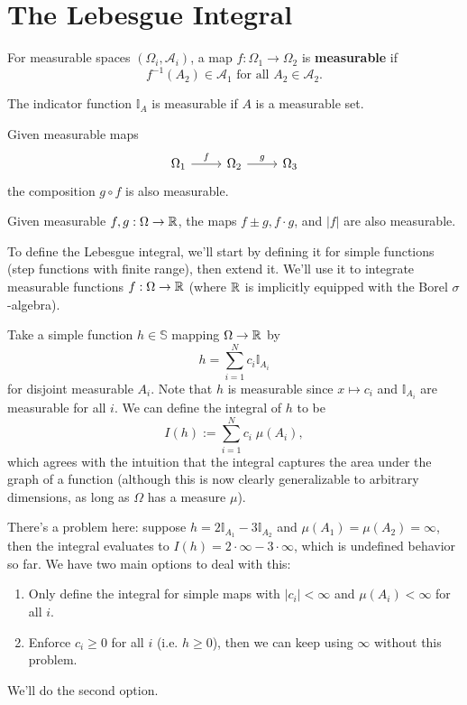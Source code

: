 \documentclass[twoside,10pt]{article}
\begin{document}
\section{The Lebesgue Integral}

\begin{defn}[]
For measurable spaces $(\Omega_i,\mathcal{A}_{i})$, a map $f:\Omega_1\to \Omega_2$ is \textbf{measurable} if
\[
f^{-1}(A_2) \in \mathcal{A}_{1} \text{ for all } A_2 \in \mathcal{A}_{2}.
\]
\end{defn}

\begin{ex}[]
The indicator function $\mathbb{I}_{A}$ is measurable if $A$ is a measurable set.
\end{ex}

\begin{prop}
Given measurable maps
\[\begin{tikzcd}
	{\Omega_1} & {\Omega_2} & {\Omega_3}
	\arrow["f", from=1-1, to=1-2]
	\arrow["g", from=1-2, to=1-3]
\end{tikzcd}\]
the composition $g \circ f$ is also measurable.
\end{prop}

\begin{ex}[]
Given measurable $f,g: \Omega \to \mathbb{R}$, the maps $f \pm g, f\cdot g$, and $|f|$ are also measurable.
\end{ex}

To define the Lebesgue integral, we'll start by defining it for simple functions (step functions with finite range), then extend it. We'll use it to integrate measurable functions $f:\Omega \to \mathbb{R}$ (where $\mathbb{R}$ is implicitly equipped with the Borel $\sigma$-algebra).

Take a simple function $h \in \mathbb{S}$ mapping $\Omega \to \mathbb{R}$ by
\[
h = \sum_{i=1}^{N} c_{i}\mathbb{I}_{A_{i}}
\] for disjoint measurable $A_{i}$. Note that $h$ is measurable since $x \mapsto c_{i}$ and $\mathbb{I}_{A_{i}}$ are measurable for all $i$. We can define the integral of $h$ to be
\[
I(h) := \sum_{i=1}^{N} c_{i} \; \mu(A_{i}),
\] which agrees with the intuition that the integral captures the area under the graph of a function (although this is now clearly generalizable to arbitrary dimensions, as long as $\Omega$ has a measure $\mu$).

There's a problem here: suppose $h = 2 \mathbb{I}_{A_{1}} - 3 \mathbb{I}_{A_2}$ and $\mu(A_1) = \mu(A_2) = \infty$, then the integral evaluates to $I(h) = 2\cdot\infty - 3\cdot\infty$, which is undefined behavior so far. We have two main options to deal with this:
\begin{enumerate}
	\item Only define the integral for simple maps with $|c_{i}| < \infty$ and $\mu(A_{i}) < \infty$ for all $i$.
	\item Enforce $c_{i} \geq 0$ for all $i$ (i.e. $h \geq 0$), then we can keep using $\infty$ without this problem.
\end{enumerate}
We'll do the second option.
\end{document}
